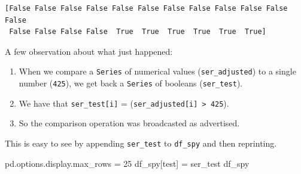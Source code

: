 \documentclass[
  letterpaper,
  DIV=11,
  numbers=noendperiod]{scrreprt}
\newenvironment{Shaded}{\begin{snugshade}}{\end{snugshade}}
\newcommand{\DecValTok}[1]{\textcolor[rgb]{0.68,0.00,0.00}{#1}}
\newcommand{\NormalTok}[1]{\textcolor[rgb]{0.00,0.23,0.31}{#1}}
\newcommand{\OperatorTok}[1]{\textcolor[rgb]{0.37,0.37,0.37}{#1}}
\newcommand{\StringTok}[1]{\textcolor[rgb]{0.13,0.47,0.30}{#1}}
\begin{document}
\begin{verbatim}
[False False False False False False False False False False False False
 False False False False  True  True  True  True  True  True]
\end{verbatim}

A few observation about what just happened:

\begin{enumerate}
\def\labelenumi{\arabic{enumi}.}
\item
  When we compare a \texttt{Series} of numerical values
  (\texttt{ser\_adjusted}) to a single number (\texttt{425}), we get
  back a \texttt{Series} of booleans (\texttt{ser\_test}).
\item
  We have that \texttt{ser\_test{[}i{]}} =
  (\texttt{ser\_adjusted{[}i{]}\ \textgreater{}\ 425}).
\item
  So the comparison operation was broadcasted as advertised.
\end{enumerate}

This is easy to see by appending \texttt{ser\_test} to \texttt{df\_spy}
and then reprinting.

\begin{Shaded}
\begin{Highlighting}[]
\NormalTok{pd.options.display.max\_rows }\OperatorTok{=} \DecValTok{25}
\NormalTok{df\_spy[}\StringTok{\textquotesingle{}test\textquotesingle{}}\NormalTok{] }\OperatorTok{=}\NormalTok{ ser\_test}
\NormalTok{df\_spy}
\end{Highlighting}
\end{Shaded}
\end{document}
